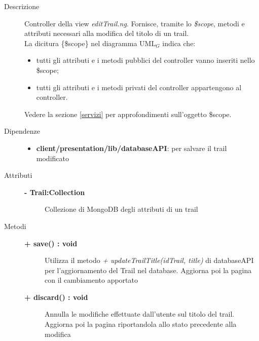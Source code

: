 \begin{description}
\item[Descrizione] \hfill
	Controller della view \textit{editTrail.ng}. Fornisce, tramite lo \textit{\$scope}, metodi e attributi necessari alla modifica del titolo di un trail.
	\\ La dicitura \{\$scope\} nel diagramma UML$_G$ indica che:
\begin{itemize}
\item tutti gli attributi e i metodi pubblici del controller vanno inseriti nello \$scope;
\item tutti gli attributi e i metodi privati del controller appartengono al controller.
\end{itemize}
Vedere la sezione \ref{servizi} per approfondimenti sull'oggetto \$scope.
	
	
\item[Dipendenze] \hfill
	\begin{itemize}
		\item \textbf{client/presentation/lib/databaseAPI}: per salvare il trail modificato
	\end{itemize}
	
	
\item[Attributi] \hfill
	\begin{description}
		\item[\textbf{- Trail:Collection			}] \hfill
			Collezione di MongoDB degli attributi di un trail
	\end{description}
	
\item[Metodi] \hfill

	\begin{description}
		\item[\textbf{\color{blue}+ save() : void			}] \hfill
			Utilizza il metodo \textit{+ updateTrailTitle(idTrail, title)} di databaseAPI per l'aggiornamento del Trail nel database. Aggiorna poi la pagina con il cambiamento apportato
	\end{description}
	
	\begin{description}
		\item[\textbf{\color{blue}+ discard() : void			}] \hfill
			Annulla le modifiche effettuate dall'utente sul titolo del trail. Aggiorna poi la pagina riportandola allo stato precedente alla modifica
	\end{description}

	
\end{description}



